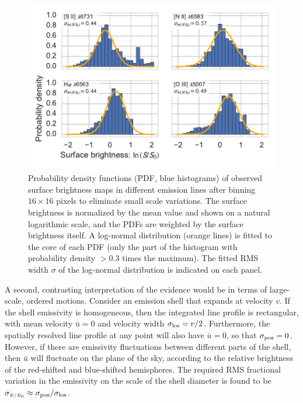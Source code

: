 \documentclass[useAMS,usenatbib]{mn2e}
\begin{document}
\begin{figure}
  \centering
  \includegraphics[width=\linewidth]{bright-hist-obs}
  \caption{Probability density functions (PDF, blue histograms) of
    observed surface brightness maps in different emission lines after
    binning \(16 \times 16\) pixels to eliminate small scale
    variations.  The surface brightness is normalized by the mean
    value and shown on a natural logarithmic scale, and the PDFs are
    weighted by the surface brightness itself.  A log-normal
    distribution (orange lines) is fitted to the core of each PDF
    (only the part of the histogram with probability density \(> 0.3\)
    times the maximum).  The fitted RMS width \(\sigma\) of the
    log-normal distribution is indicated on each panel.}
  \label{fig:surf-bright-pdf}
\end{figure}

\newcommand\Efrac{\ensuremath{_{\scriptscriptstyle E/E_0}}}
\newcommand\lnSfrac{\ensuremath{_{\scriptscriptstyle \ln S/S_0}}}
\newcommand\Sfrac{\ensuremath{_{\scriptscriptstyle S/S_0}}}

A second, contrasting interpretation of the evidence would be in terms
of large-scale, ordered motions.  Consider an emission shell that
expands at velocity \(v\).  If the shell emissivity is homogeneous,
then the integrated line profile is rectangular, with mean velocity
\(\bar{u} = 0\) and velocity width \(\sigma_{\mathrm{los}} = v/2\).  Furthermore,
the spatially resolved line profile at any point will also have
\(\bar{u} = 0\), so that \(\sigma_{\mathrm{pos}} = 0\).  However, if there are
emissivity fluctuations between different parts of the shell, then
\(\bar{u}\) will fluctuate on the plane of the sky, according to the
relative brightness of the red-shifted and blue-shifted hemispheres.
The required RMS fractional variation in the emissivity on the scale
of the shell diameter is found to be \(\sigma\Efrac \approx
\sigma\pos/\sigma\los\). 
\end{document}
